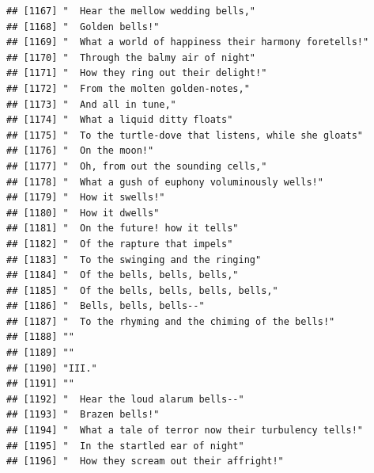 \documentclass{article}\usepackage[]{graphicx}\usepackage[]{color}
\makeatletter
\newenvironment{kframe}{%
 \def\at@end@of@kframe{}%
 \ifinner\ifhmode%
  \def\at@end@of@kframe{\end{minipage}}%
  \begin{minipage}{\columnwidth}%
 \fi\fi%
 \def\FrameCommand##1{\hskip\@totalleftmargin \hskip-\fboxsep
 \colorbox{shadecolor}{##1}\hskip-\fboxsep
     \hskip-\linewidth \hskip-\@totalleftmargin \hskip\columnwidth}%
 \MakeFramed {\advance\hsize-\width
   \@totalleftmargin\z@ \linewidth\hsize
   \@setminipage}}%
 {\par\unskip\endMakeFramed%
 \at@end@of@kframe}
\newenvironment{knitrout}{}{} %
\makeatother
\begin{document}
\begin{knitrout}
\begin{kframe}
\begin{verbatim}
## [1167] "  Hear the mellow wedding bells,"                                            
## [1168] "  Golden bells!"                                                             
## [1169] "  What a world of happiness their harmony foretells!"                        
## [1170] "  Through the balmy air of night"                                            
## [1171] "  How they ring out their delight!"                                          
## [1172] "  From the molten golden-notes,"                                             
## [1173] "  And all in tune,"                                                          
## [1174] "  What a liquid ditty floats"                                                
## [1175] "  To the turtle-dove that listens, while she gloats"                         
## [1176] "  On the moon!"                                                              
## [1177] "  Oh, from out the sounding cells,"                                          
## [1178] "  What a gush of euphony voluminously wells!"                                
## [1179] "  How it swells!"                                                            
## [1180] "  How it dwells"                                                             
## [1181] "  On the future! how it tells"                                               
## [1182] "  Of the rapture that impels"                                                
## [1183] "  To the swinging and the ringing"                                           
## [1184] "  Of the bells, bells, bells,"                                               
## [1185] "  Of the bells, bells, bells, bells,"                                        
## [1186] "  Bells, bells, bells--"                                                     
## [1187] "  To the rhyming and the chiming of the bells!"                              
## [1188] ""                                                                            
## [1189] ""                                                                            
## [1190] "III."                                                                        
## [1191] ""                                                                            
## [1192] "  Hear the loud alarum bells--"                                              
## [1193] "  Brazen bells!"                                                             
## [1194] "  What a tale of terror now their turbulency tells!"                         
## [1195] "  In the startled ear of night"                                              
## [1196] "  How they scream out their affright!"                                       

\end{verbatim}
\end{kframe}
\end{knitrout}
\end{document}
